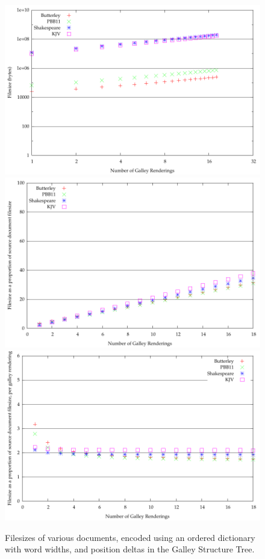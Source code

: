 \begin{figure}
  \begin{center}
  \includegraphics[width=\textwidth]{gnuplot/5-b}
  \includegraphics[width=\textwidth]{gnuplot/5-s}
  \includegraphics[width=\textwidth]{gnuplot/5-r}
  \end{center}
  \caption[Filesizes with relative positioning]{Filesizes of various documents, encoded using an ordered dictionary with word widths, and position deltas in the Galley Structure Tree.}
  \label{fig:size-deltas}
\end{figure}



